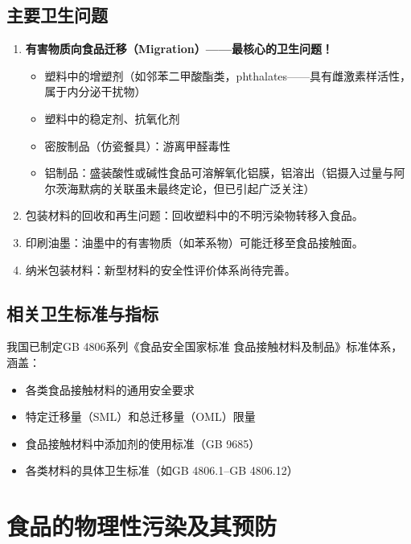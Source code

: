 \subsection{主要卫生问题}

\begin{enumerate}[leftmargin=*]
    \item \textbf{有害物质向食品迁移（Migration）——最核心的卫生问题！}
    \begin{itemize}[leftmargin=*]
        \item 塑料中的增塑剂（如邻苯二甲酸酯类，phthalates——具有雌激素样活性，属于内分泌干扰物）
        \item 塑料中的稳定剂、抗氧化剂
        \item 密胺制品（仿瓷餐具）：游离甲醛毒性
        \item 铝制品：盛装酸性或碱性食品可溶解氧化铝膜，铝溶出（铝摄入过量与阿尔茨海默病的关联虽未最终定论，但已引起广泛关注）
    \end{itemize}
    \item 包装材料的回收和再生问题：回收塑料中的不明污染物转移入食品。
    \item 印刷油墨：油墨中的有害物质（如苯系物）可能迁移至食品接触面。
    \item 纳米包装材料：新型材料的安全性评价体系尚待完善。
\end{enumerate}

\subsection{相关卫生标准与指标}

\begin{defbox}
我国已制定GB 4806系列《食品安全国家标准 食品接触材料及制品》标准体系，涵盖：
\begin{itemize}[leftmargin=*]
    \item 各类食品接触材料的通用安全要求
    \item 特定迁移量（SML）和总迁移量（OML）限量
    \item 食品接触材料中添加剂的使用标准（GB 9685）
    \item 各类材料的具体卫生标准（如GB 4806.1--GB 4806.12）
\end{itemize}
\end{defbox}

\section{食品的物理性污染及其预防}

